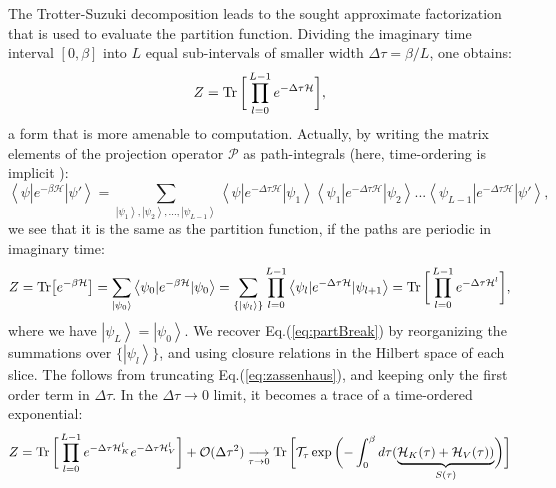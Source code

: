 The Trotter-Suzuki decomposition leads to the sought approximate factorization that is used to evaluate the partition function.
Dividing the imaginary time interval $[0, \beta ]$ into $L$ equal sub-intervals of smaller width $\Delta \tau = \beta / L$, one obtains:
\begin{equation}\label{eq:partBreak}
Z =  \operatorname{Tr} \bigg[ \prod_{l=0}^{L-1} e^{-\Delta\tau \mathcal{H} } \bigg] ,
\end{equation}
a form that is more amenable to computation.
Actually, by writing the matrix elements of the projection operator $\mathcal{P}$ as path-integrals (here, time-ordering is implicit \cite{hirsch_discrete_1983}):
\begin{equation}
\left\langle \psi | e^{-\beta \mathcal{H} } | \psi' \right\rangle = \sum_{\left| \psi_1 \right\rangle, \left| \psi_2 \right\rangle,..., \left| \psi_{L-1} \right\rangle }  \left\langle \psi | e^{-\Delta \tau \mathcal{H} } | \psi_1 \right\rangle \left\langle \psi_1 | e^{-\Delta \tau \mathcal{H} } | \psi_2 \right\rangle ... \left\langle \psi_{L - 1} | e^{-\Delta \tau \mathcal{H} } | \psi' \right\rangle ,
\end{equation}
we see that it is the same as the partition function, if the paths are periodic in imaginary time:
\begin{equation}
Z = \text{Tr} \big[ e^{-\beta \mathcal{H} } \big] = \sum_{\left| \psi_0 \right\rangle} \left\langle \psi_0 | e^{-\beta \mathcal{H}} | \psi_0 \right\rangle = \sum_{\{ \left| \psi_l \right\rangle \}} \prod_{l = 0}^{L - 1} \left\langle \psi_{l} | e^{-\Delta \tau \mathcal{H} } | \psi_{l+1} \right\rangle = \operatorname{Tr} \bigg[ \prod_{l=0}^{L-1} e^{-\Delta\tau \mathcal{H}^l } \bigg] ,
\end{equation}
where we have $\left| \psi_L \right\rangle = \left| \psi_0 \right\rangle$. We recover Eq.(\ref{eq:partBreak}) by reorganizing the summations over $\{ \left| \psi_l \right\rangle \}$, and using closure relations in the Hilbert space of each slice.
The  follows from truncating Eq.(\ref{eq:zassenhaus}), and keeping only the first order term in $\Delta \tau$.
In the $\Delta \tau \rightarrow 0$ limit, it becomes a trace of a time-ordered exponential:
\begin{equation}\label{eq:Z_propagator}
Z = \operatorname{Tr} \bigg[ \prod_{l=0}^{L-1} e^{-\Delta\tau \mathcal{H}_{K}^l } e^{-\Delta\tau \mathcal{H}_{V}^l } \bigg] + \mathcal{O}(\Delta \tau^2) \underset{\tau \rightarrow 0}{\longrightarrow}
 \operatorname{Tr} \bigg[ \mathcal{T}_\tau \exp \bigg( {- \int_0^\beta   d\tau ( \underbrace{\mathcal{H}_K (\tau) + \mathcal{H}_V ( \tau) ) }_{S(\tau)} } \bigg) \bigg]
\end{equation}

